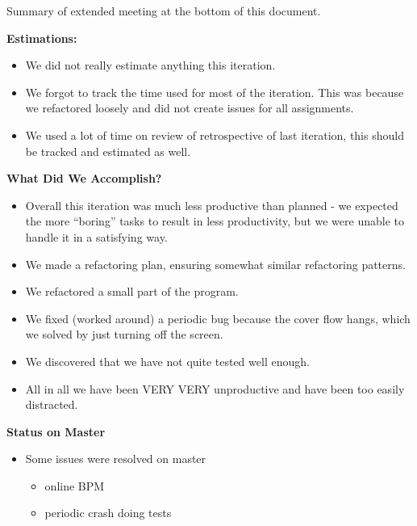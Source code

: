 Summary of extended meeting at the bottom of this document.

\textbf{Estimations:}
\begin{itemize}
\item We did not really estimate anything this iteration.
\item We forgot to track the time used for most of the iteration. This was because we refactored loosely and did not create issues for all assignments.
\item We used a lot of time on review of retrospective of last iteration, this should be tracked and estimated as well.
\end{itemize}


\textbf{What Did We Accomplish?}
\begin{itemize}
\item Overall this iteration was much less productive than planned - we expected the more “boring” tasks to result in less productivity, but we were unable to handle it in a satisfying way.
\item We made a refactoring plan, ensuring somewhat similar refactoring patterns.
\item We refactored a small part of the program.
\item We fixed (worked around) a periodic bug because the cover flow hangs, which we solved by just turning off the screen. 
\item We discovered that we have not quite tested well enough. 
\item All in all we have been VERY VERY unproductive and have been too easily distracted.
\end{itemize}


\textbf{Status on Master}
\begin{itemize}
\item Some issues were resolved on master
\begin{itemize}
\item online BPM
\item periodic crash doing tests
\end{itemize}
\end{itemize}

